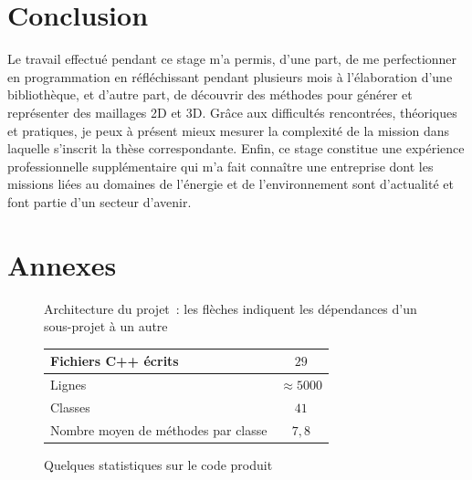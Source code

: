 \documentclass[12pt,a4paper]{report}
\begin{document}
\newpage
\section{Conclusion}

Le travail effectué pendant ce stage m'a permis, d'une part, de me perfectionner en programmation en réfléchissant pendant plusieurs mois à l'élaboration d'une bibliothèque, et d'autre part, de découvrir des méthodes pour générer et représenter des maillages 2D et 3D.
Grâce aux difficultés rencontrées, théoriques et pratiques, je peux à présent mieux mesurer la complexité de la mission dans laquelle s'inscrit la thèse correspondante.
Enfin, ce stage constitue une expérience professionnelle supplémentaire qui m'a fait connaître une entreprise dont les missions liées au domaines de l'énergie et de l'environnement sont d'actualité et font partie d'un secteur d'avenir.

\newpage
\section{Annexes}

\begin{figure}[htbp]
\begin{center}
\usetikzlibrary {shapes.geometric}
\caption{Architecture du projet~: les flèches indiquent les dépendances d'un sous-projet à un autre}
\label{archi}
\end{center}
\end{figure}

\begin{figure}
\begin{center}
\begin{tabular}{|l|c|}\hline
Fichiers C++ écrits & $29$ \\\hline
Lignes & $\approx 5000$\\\hline
Classes & $41$\\\hline
Nombre moyen de méthodes par classe & $7,8$\\\hline
\end{tabular}
\caption{Quelques statistiques sur le code produit}
\label{stats}
\end{center}
\end{figure}
\end{document}
